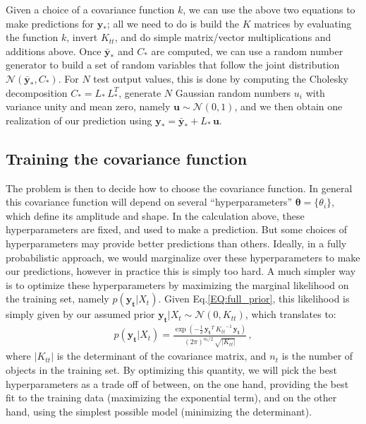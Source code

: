 \documentclass[11pt,a4paper]{article}
\newcommand\req[1]{Eq.\;\ref{#1}}
\newcommand{\abs}[1]{\left| #1 \right|}
\numberwithin{equation}{section}
\begin{document}
Given a choice of a covariance function $k$, we can use the above two equations to make predictions for $\mathbf{y_*}$; all we need to do is build the $K$ matrices by evaluating the function $k$, invert $K_{tt}$, and do simple matrix/vector multiplications and additions above. Once $\mathbf{\bar{y}_*}$ and $C_*$ are computed, we can use a random number generator to build a set of random variables that follow the joint distribution $\mathcal{N}(\mathbf{\bar{y}_*}, C_*)$. For $N$ test output values, this is done by computing the Cholesky decomposition $C_* = L_*\,L_*^T$, generate $N$ Gaussian random numbers $u_i$ with variance unity and mean zero, namely $\mathbf{u} \sim \mathcal{N}(0, 1)$, and we then obtain one realization of our prediction using $\mathbf{y_*} = \mathbf{\bar{y}_*} + L_*\,\mathbf{u}$.

\subsection{Training the covariance function}

The problem is then to decide how to choose the covariance function. In general this covariance function will depend on several ``hyperparameters'' ${\bm\theta} = \{\theta_i\}$, which define its amplitude and shape. In the calculation above, these hyperparameters are fixed, and used to make a prediction. But some choices of hyperparameters may provide better predictions than others. Ideally, in a fully probabilistic approach, we would marginalize over these hyperparameters to make our predictions, however in practice this is simply too hard. A much simpler way is to optimize these hyperparameters by maximizing the marginal likelihood on the training set, namely $p(\mathbf{y_t}|X_t)$. Given \req{EQ:full_prior}, this likelihood is simply given by our assumed prior $\mathbf{y_t} | X_t \sim \mathcal{N}(0,K_{tt})$, which translates to:
\begin{align}
p(\mathbf{y_t} | X_t) = \frac{\exp\left(-\frac{1}{2}\,\mathbf{y_t}^T\,{K_{tt}}^{-1}\,\mathbf{y_t}\right)}{(2\pi)^{n_t/2}\,\sqrt{\abs{K_{tt}}}}\,,
\end{align}
where $\abs{K_{tt}}$ is the determinant of the covariance matrix, and $n_t$ is the number of objects in the training set. By optimizing this quantity, we will pick the best hyperparameters as a trade off of between, on the one hand, providing the best fit to the training data (maximizing the exponential term), and on the other hand, using the simplest possible model (minimizing the determinant).
\end{document}
